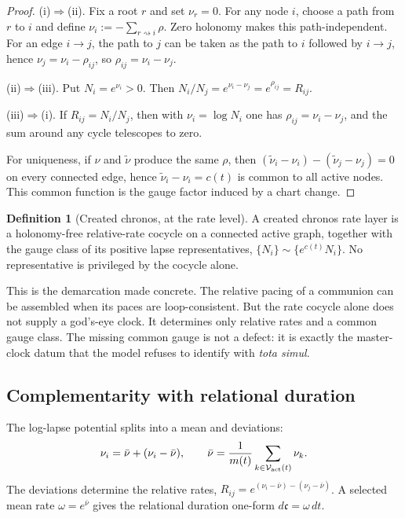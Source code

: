 \documentclass[11pt,a4paper]{article}
\theoremstyle{definition}
\newtheorem{definition}{Definition}[section]
\theoremstyle{plain}
\theoremstyle{remark}
\begin{document}
\begin{proof}
(i)\(\Rightarrow\)(ii). Fix a root \(r\) and set \(\nu_r=0\). For any node \(i\),
choose a path from \(r\) to \(i\) and define \(\nu_i:=-\sum_{r\rightsquigarrow i}\rho\).
Zero holonomy makes this path-independent. For an edge \(i\to j\), the path to
\(j\) can be taken as the path to \(i\) followed by \(i\to j\), hence
\(\nu_j=\nu_i-\rho_{ij}\), so \(\rho_{ij}=\nu_i-\nu_j\).

(ii)\(\Rightarrow\)(iii). Put \(N_i=e^{\nu_i}>0\). Then
\(N_i/N_j=e^{\nu_i-\nu_j}=e^{\rho_{ij}}=R_{ij}\).

(iii)\(\Rightarrow\)(i). If \(R_{ij}=N_i/N_j\), then with \(\nu_i=\log N_i\) one has
\(\rho_{ij}=\nu_i-\nu_j\), and the sum around any cycle telescopes to zero.

For uniqueness, if \(\nu\) and \(\tilde\nu\) produce the same \(\rho\), then
\((\tilde\nu_i-\nu_i)-(\tilde\nu_j-\nu_j)=0\) on every connected edge, hence
\(\tilde\nu_i-\nu_i=c(t)\) is common to all active nodes. This common function is
the gauge factor induced by a chart change.
\end{proof}

\begin{definition}[Created chronos, at the rate level]
A created chronos rate layer is a holonomy-free relative-rate cocycle on a
connected active graph, together with the gauge class of its positive lapse
representatives, \(\{N_i\}\sim\{e^{c(t)}N_i\}\). No representative is privileged by
the cocycle alone.
\end{definition}

This is the demarcation made concrete. The relative pacing of a communion can be
assembled when its paces are loop-consistent. But the rate cocycle alone does not
supply a god's-eye clock. It determines only relative rates and a common gauge
class. The missing common gauge is not a defect: it is exactly the master-clock
datum that the model refuses to identify with \textit{tota simul}.

\subsection{Complementarity with relational duration}

The log-lapse potential splits into a mean and deviations:
\[
\nu_i
=
\bar\nu
+
(\nu_i-\bar\nu),
\qquad
\bar\nu
=
\frac1{m(t)}
\sum_{k\in\mathcal V_{\rm act}(t)}
\nu_k.
\]
The deviations determine the relative rates,
\(R_{ij}=e^{(\nu_i-\bar\nu)-(\nu_j-\bar\nu)}\). A selected mean rate
\(\omega=e^{\bar\nu}\) gives the relational duration one-form \(d\mathfrak c=\omega\,dt\).
\end{document}
